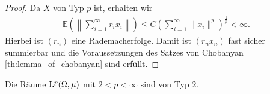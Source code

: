 \begin{proof}
	Da $ X $ von Typ $ p $ ist, erhalten wir
	\begin{align*}
		\mathbb{E}
		\left( \left\| \sum \limits_{i=1}^\infty r_i x_i  \right\|\right)
		\leq
		C 
		\left( \sum \limits_{i=1}^\infty\| x_i \|^p  \right)^\frac{1}{p} < \infty.
	\end{align*}
	Hierbei ist $ (r_n) $ eine Rademacherfolge. Damit ist $ (r_n x_n) $ fast sicher summierbar und die Voraussetzungen des Satzes von Chobanyan \ref{th:lemma_of_chobanyan} sind erfüllt.\qedhere
	
	
\end{proof}

\begin{sz}\label{th:Lp_type2}
	Die Räume $ \mathrm{L}^p(\Omega,\mu) $ mit $ 2 < p < \infty $ sind von Typ $ 2 $.
\end{sz}

